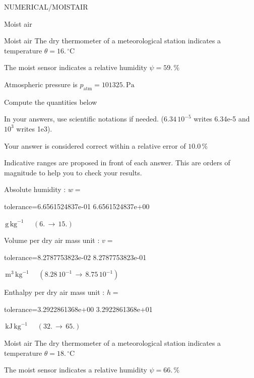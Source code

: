 \documentclass[12pt]{article}
\begin{document}
\begin{quiz}{NUMERICAL/MOISTAIR}
\begin{cloze}{Moist air}
\end{cloze} 


 \begin{cloze}{Moist air} 
The dry thermometer of a meteorological station indicates a temperature $\theta = 16.\,  \mathrm{^\circ\mathrm{C}} $

The moist sensor indicates a relative humidity $\psi = 59.\, \% $

Atmospheric pressure is $p_{\text{atm}} = 101325.\,  \mathrm{Pa} $

 

Compute the quantities below

In your answers, use scientific notations if needed.  ($6.34\, 10^{-5}$ writes 6.34e-5 and $10^{3}$ writes 1e3).

Your answer is considered correct within a relative error of $10.0\, \% $

Indicative ranges are proposed in front of each answer. This are orders of magnitude to help you to check your results.

Absolute humidity : $w =  $
\begin{numerical}[points=1] 
\item[tolerance={6.6561524837e-01}] 6.6561524837e+00 
\end{numerical} 
 $\,  \mathrm{g}\,  \mathrm{kg}^{-1}$ 
 $ \quad (6. \, \rightarrow \, 15.) $ 

Volume per dry air mass unit : $v =  $
\begin{numerical}[points=1] 
\item[tolerance={8.2787753823e-02}] 8.2787753823e-01 
\end{numerical} 
 $\,  \mathrm{m}^{3}\,  \mathrm{kg}^{-1}$ 
 $ \quad ( 8.28 \, 10^{-1}  \, \rightarrow \,  8.75 \, 10^{-1} ) $ 

Enthalpy per dry air mass unit : $h =  $
\begin{numerical}[points=2] 
\item[tolerance={3.2922861368e+00}] 3.2922861368e+01 
\end{numerical} 
 $\,  \mathrm{kJ}\,  \mathrm{kg}^{-1}$ 
 $ \quad (32. \, \rightarrow \, 65.) $ 

\end{cloze} 


 \begin{cloze}{Moist air} 
The dry thermometer of a meteorological station indicates a temperature $\theta = 18.\,  \mathrm{^\circ\mathrm{C}} $

The moist sensor indicates a relative humidity $\psi = 66.\, \% $


\end{cloze}
\end{quiz}
\end{document}
